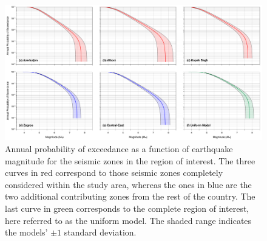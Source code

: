 \begin{figure}[t]
    \centering
    \includegraphics[width=\textwidth]{figures/pdf/figure-07} 
    \caption{Annual probability of exceedance as a function of earthquake magnitude for the seismic zones in the region of interest. The three curves in red correspond to those seismic zones completely considered within the study area, whereas the ones in blue are the two additional contributing zones from the rest of the country. The last curve in green corresponds to the complete region of interest, here referred to as the uniform model. The shaded range indicates the models' $\pm 1$ standard deviation.}
    \label{fig:annualp}
\end{figure}

